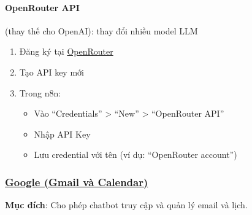 \paragraph{OpenRouter API} (thay thế cho OpenAI): thay đổi nhiều model LLM 
\begin{enumerate}
    \item Đăng ký tại \href{https://openrouter.ai/}{OpenRouter}
    \item Tạo API key mới
    \item Trong n8n:
    \begin{itemize}
        \item Vào ``Credentials'' > ``New'' > ``OpenRouter API''
        \item Nhập API Key
        \item Lưu credential với tên (ví dụ: ``OpenRouter account'')
    \end{itemize}
\end{enumerate}

\subsubsection{\underline{Google (Gmail và Calendar)}}
\textbf{Mục đích}: Cho phép chatbot truy cập và quản lý email và lịch.

